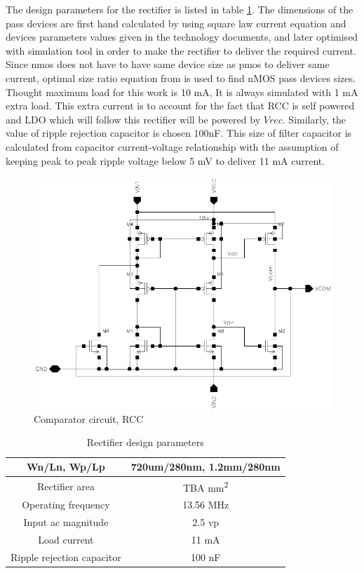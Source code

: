 \documentclass[12pt,a4paper,UKenglish]{report}
\begin{document}
The design parameters for the rectifier is listed in table  \ref{tab:rect_parameter}. The dimensions of the pass devices are first hand calculated by using square law current equation and devices parameters values given in the technology documents, and later optimised with simulation tool in order to make the rectifier to deliver the required current. Since \acrshort{nmos} does not have to have same device size as \acrshort{pmos} to deliver same current, optimal size ratio equation from \cite{rectsize} is used to find nMOS pass devices sizes. Thought maximum load for this work is 10 mA, It is always simulated with 1 mA extra load. This extra current is to account for the fact that RCC is self powered and LDO which will follow this rectifier will be powered by $Vrec$. Similarly, the value of ripple rejection capacitor is chosen 100nF. This size of 
filter capacitor is calculated from capacitor current-voltage relationship with the assumption of keeping peak to peak ripple voltage below 5 mV to deliver 11 mA current.  \\

\begin{figure}[H] %
   \centering
   \includegraphics[width=\textwidth]{img/rectifier_rcc5.pdf} 
   \caption{Comparator circuit, RCC }
   \label{rcc}
\end{figure}

\begin{table}[H]
\caption{Rectifier design parameters}
\begin{center}
\begin{tabular}{c|c}
\hline \hline
Wn/Ln, Wp/Lp 		& 720um/280nm, 1.2mm/280nm \\ \hline
Rectifier area 		& TBA mm\textsuperscript{2} \\ \hline
Operating frequency 	& 13.56 MHz \\ \hline
Input ac magnitude	& 2.5  \acrshort{vp}\\ \hline
Load current 		& 11 mA \\ \hline
Ripple rejection capacitor	& 100 nF \\ 
\hline \hline
\end{tabular}
\end{center}
\label{tab:rect_parameter}
\end{table}
\end{document}
